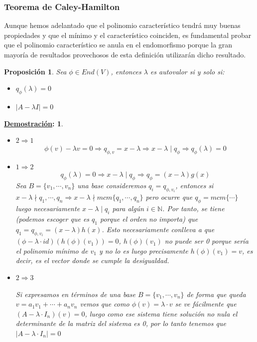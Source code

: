 \documentclass[10pt,a4paper,openright]{book}
\theoremstyle{break}
\newtheorem*{prop}{Proposición}
\newtheorem*{demo}{\underline{Demostración}:}
\begin{document}
\subsubsection{Teorema de Caley-Hamilton}
Aunque hemos adelantado que el polinomio característico tendrá muy buenas propiedades y que el mínimo y el característico coinciden, es fundamental probar que el polinomio característico se anula en el endomorfismo porque la gran mayoría de resultados provechosos de esta definición utilizarán dicho resultado.

\begin{prop}
Sea $\phi\in End(V)$, entonces $\lambda$ es autovalor si y solo si:
\begin{itemize}
\item $q_\phi(\lambda)=0$
\item $\vert A -\lambda I\vert = 0$
\end{itemize}
\end{prop}
\begin{demo}
\begin{itemize}
\item $2\Rightarrow 1$
$$\phi(v)-\lambda v =0 \Rightarrow q_{\phi,v}=x-\lambda \Rightarrow x-\lambda\mid q_\phi\Rightarrow q_\phi(\lambda)=0$$

\item $1\Rightarrow 2$
$$q_\phi(\lambda)=0\Rightarrow x-\lambda\mid q_\phi\Rightarrow q_\phi = (x-\lambda)g(x)$$
Sea $B=\{v_1, \cdots, v_n\}$ una base consideremos $q_i=q_{\phi,v_i}$, entonces si $x-\lambda \nmid q_1, \cdots, q_n \Rightarrow x-\lambda\nmid mcm\{q_1, \cdots, q_n\}$ pero ocurre que $q_\phi = mcm \{\cdots\}$ luego necesariamente $x-\lambda \mid q_i$ para algún $i \in \mathbb N$. Por tanto, se tiene (podemos escoger que es $q_1$ porque el orden no importa) que $q_1=q_{\phi,v_i} = (x-\lambda)h(x)$. Esto necesariamente conlleva a que $(\phi-\lambda\cdot id)(h(\phi)(v_1))=0$, $h(\phi)(v_1)$ no puede ser 0 porque sería el polinomio mínimo de $v_1$ y no lo es luego precisamente $h(\phi)(v_1)=v$, es decir, es el vector donde se cumple la desigualdad.   

\item $2\Rightarrow 3$

Si expresamos en términos de una base $B=\{v_1,\cdots, v_n\}$ de forma que queda $v=a_1v_1+\cdots+a_nv_n$ vemos que como $\phi(v)=\lambda\cdot v$ se ve fácilmente que $(A-\lambda\cdot I_n)(v)=0$, luego como ese sistema tiene solución no nula el determinante de la matriz del sistema es 0, por lo tanto tenemos que $|A-\lambda \cdot I_n|=0$
\end{itemize}
\end{demo}
\end{document}
